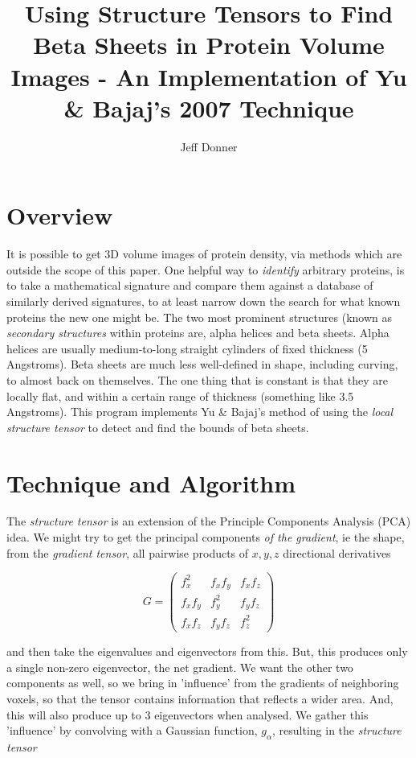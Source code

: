 \documentclass{article}
\begin{document}
\title{Using Structure Tensors to Find Beta Sheets in Protein Volume Images - An Implementation of Yu \& Bajaj's 2007 Technique}
\author{Jeff Donner}

\maketitle

\section{Overview}

It is possible to get 3D volume images of protein density, via
methods which are outside the scope of this paper. One helpful way to
\emph{identify} arbitrary proteins, is to take a mathematical signature
and compare them against a database of similarly derived signatures,
to at least narrow down the search for what known proteins the new one
might be. The two most prominent structures (known as \emph{secondary structures}
within proteins are, alpha helices and beta sheets. Alpha helices are
usually medium-to-long straight cylinders of fixed thickness (5 Angstroms).
Beta sheets are much less well-defined in shape, including curving, to almost
back on themselves. The one thing that is constant is that they are locally
flat, and within a certain range of thickness (something like 3.5 Angstroms).
This program implements Yu \& Bajaj's method \cite{yubajaj} of using the \emph{local structure
tensor} to detect and find the bounds of beta sheets.

\section{Technique and Algorithm}

The \emph{structure tensor} is an extension of the Principle Components Analysis (PCA) idea.
We might try to get the principal components \emph{of the gradient}, ie the shape, from the \emph{gradient tensor},
all pairwise products of $x, y, z$ directional derivatives

\[
  G =
\left( \begin{array}{ccc}
  f_{x}^2 & f_{x}f_{y} & f_{x}f_{z} \\
  f_{x}f_{y} & f_{y}^2 & f_{y}f_{z} \\
  f_{x}f_{z} & f_{y}f_{z} & f_{z}^2
\end{array} \right)
\]

and then take the eigenvalues and eigenvectors from this. But, this
produces only a single non-zero eigenvector, the net gradient. We want
the other two components as well, so we bring in 'influence' from the
gradients of neighboring voxels, so that the tensor contains
information that reflects a wider area. And, this will also produce up
to 3 eigenvectors when analysed. We gather this 'influence' by convolving
with a Gaussian function, $g_{\alpha}$, resulting in the \emph{structure tensor}
\end{document}
